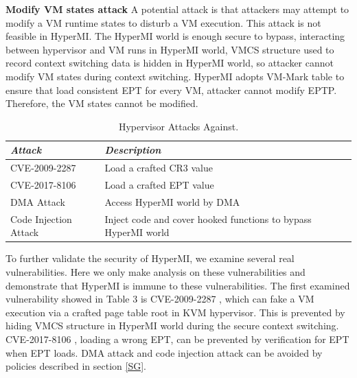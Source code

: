 \documentclass[conference]{IEEEtran}
\begin{document}

\textbf{Modify VM states attack}
A potential attack is that attackers may attempt to modify a VM runtime states to disturb a VM execution. This attack is not feasible in HyperMI. The HyperMI world is enough secure to bypass, interacting between  hypervisor and VM runs in HyperMI world, VMCS structure used to record context switching data is hidden in HyperMI world, so attacker cannot modify VM states during context switching. HyperMI adopts VM-Mark table to ensure that load consistent EPT for every VM, attacker cannot modify EPTP. Therefore, the VM states cannot be modified.


\begin{table}
\centering
\caption{Hypervisor Attacks Against.}\label{tab3}
\begin{tabular}{p{2.4cm}|p{5.5cm}}
\hline
{\itshape\bfseries Attack} & {\itshape\bfseries Description} \\
\hline
CVE-2009-2287 & Load a crafted CR3 value\\
\hline
CVE-2017-8106 & Load a crafted EPT value \\
\hline
DMA Attack & Access HyperMI world by DMA \\
\hline
Code Injection Attack & Inject code and cover hooked functions to bypass HyperMI world \\
\hline
\end{tabular}
\end{table}

To further validate the security of HyperMI, we examine several real vulnerabilities. Here we only make analysis on these vulnerabilities and demonstrate that HyperMI is immune to these vulnerabilities. The first examined vulnerability showed in Table 3 is CVE-2009-2287 \cite{cve2009}, which can fake a VM execution via a crafted page table root in KVM hypervisor. This is prevented by hiding VMCS structure in HyperMI world during the secure context switching. CVE-2017-8106 \cite{cve2017}, loading a wrong EPT, can be prevented by verification for EPT when EPT loads. DMA attack and code injection attack can be avoided by policies described in section \ref{SG}.
\end{document}
